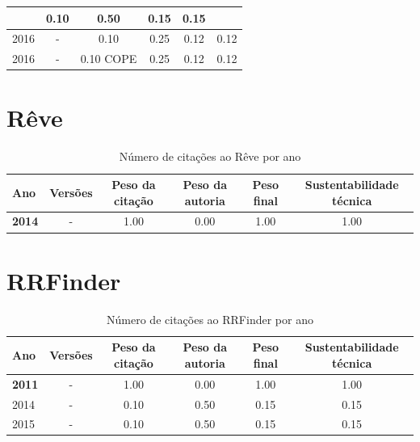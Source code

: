 \begin{table}[H]
\begin{tabular}{| l | c | c | c | c | c |}
          &
          0.10
          &
          0.50
          &
          0.15
          &
            {\color{red} 0.15}
          \\
\hline
            2016
          &
          -
          &
          0.10
          &
          0.25
          &
          0.12
          &
            {\color{red} 0.12}
          \\
            2016
          &
          -
          &
          0.10
            {\tiny COPE}
          &
          0.25
          &
          0.12
          &
            {\color{red} 0.12}
          \\
\hline
\end{tabular}
\end{table}



\section{Rêve}


\begin{table}[H]
\caption{Número de citações ao Rêve por ano}
\centering
\begin{tabular}{| l | c | c | c | c | c |}
  \hline
  Ano & Versões & Peso da citação & Peso da autoria & Peso final & Sustentabilidade técnica \\
  \hline
            {\bf 2014}
          &
          -
          &
          1.00
          &
          0.00
          &
          1.00
          &
            {\color{blue} 1.00}
          \\
\hline
\end{tabular}
\end{table}



\section{RRFinder}


\begin{table}[H]
\caption{Número de citações ao RRFinder por ano}
\centering
\begin{tabular}{| l | c | c | c | c | c |}
  \hline
  Ano & Versões & Peso da citação & Peso da autoria & Peso final & Sustentabilidade técnica \\
  \hline
            {\bf 2011}
          &
          -
          &
          1.00
          &
          0.00
          &
          1.00
          &
            {\color{blue} 1.00}
          \\
\hline
            2014
          &
          -
          &
          0.10
          &
          0.50
          &
          0.15
          &
            {\color{red} 0.15}
          \\
\hline
            2015
          &
          -
          &
          0.10
          &
          0.50
          &
          0.15
          &
            {\color{red} 0.15}
          \\
\hline
\end{tabular}
\end{table}



